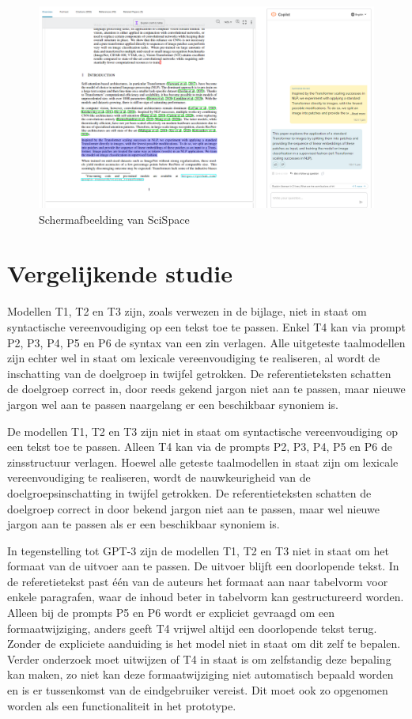 \begin{figure}[H]
	\includegraphics{img/typeset-example.png}
	\caption{Schermafbeelding van SciSpace}
\end{figure}

\section{Vergelijkende studie}

Modellen T1, T2 en T3 zijn, zoals verwezen in de bijlage, niet in staat om syntactische vereenvoudiging op een tekst toe te passen. Enkel T4 kan via prompt P2, P3, P4, P5 en P6 de syntax van een zin verlagen. Alle uitgeteste taalmodellen zijn echter wel in staat om lexicale vereenvoudiging te realiseren, al wordt de inschatting van de doelgroep in twijfel getrokken. De referentieteksten schatten de doelgroep correct in, door reeds gekend jargon niet aan te passen, maar nieuwe jargon wel aan te passen naargelang er een beschikbaar synoniem is.

\medspace

De modellen T1, T2 en T3 zijn niet in staat om syntactische vereenvoudiging op een tekst toe te passen. Alleen T4 kan via de prompts P2, P3, P4, P5 en P6 de zinsstructuur verlagen. Hoewel alle geteste taalmodellen in staat zijn om lexicale vereenvoudiging te realiseren, wordt de nauwkeurigheid van de doelgroepsinschatting in twijfel getrokken. De referentieteksten schatten de doelgroep correct in door bekend jargon niet aan te passen, maar wel nieuwe jargon aan te passen als er een beschikbaar synoniem is. 

\medspace

In tegenstelling tot GPT-3 zijn de modellen T1, T2 en T3 niet in staat om het formaat van de uitvoer aan te passen. De uitvoer blijft een doorlopende tekst. In de referetietekst past één van de auteurs het formaat aan naar tabelvorm voor enkele paragrafen, waar de inhoud beter in tabelvorm kan gestructureerd worden. Alleen bij de prompts P5 en P6 wordt er expliciet gevraagd om een formaatwijziging, anders geeft T4 vrijwel altijd een doorlopende tekst terug. Zonder de expliciete aanduiding is het model niet in staat om dit zelf te bepalen. Verder onderzoek moet uitwijzen of T4 in staat is om zelfstandig deze bepaling kan maken, zo niet kan deze formaatwijziging niet automatisch bepaald worden en is er tussenkomst van de eindgebruiker vereist. Dit moet ook zo opgenomen worden als een functionaliteit in het prototype.


